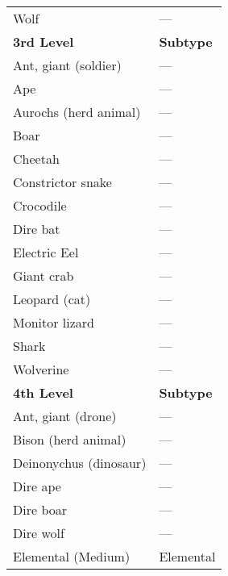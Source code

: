 \begin{xtabular}{ll}
Wolf                                          & ---                \\
\textbf{3rd Level}                            & \textbf{Subtype} \\
Ant, giant (soldier)                          & ---                \\
Ape                                           & ---                \\
Aurochs (herd animal)                         & ---                \\
Boar                                          & ---                \\
Cheetah                                       & ---                \\
Constrictor snake                             & ---                \\
Crocodile                                     & ---                \\
Dire bat                                      & ---                \\
Electric Eel                                  & ---                \\
Giant crab                                    & ---                \\
Leopard (cat)                                 & ---                \\
Monitor lizard                                & ---                \\
Shark                                         & ---                \\
Wolverine                                     & ---                \\
\textbf{4th Level}                            & \textbf{Subtype} \\
Ant, giant (drone)                            & ---                \\
Bison (herd animal)                           & ---                \\
Deinonychus (dinosaur)                        & ---                \\
Dire ape                                      & ---                \\
Dire boar                                     & ---                \\
Dire wolf                                     & ---                \\
Elemental (Medium)                            & Elemental        \\

\end{xtabular}
